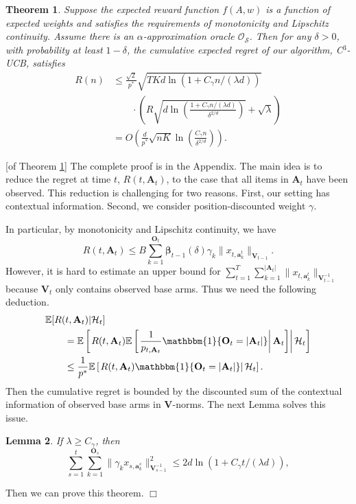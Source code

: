\documentclass{article}
\newcommand{\bbeta}{\boldsymbol{\beta}}
\newcommand{\EE}{\mathbb{E}}
\newcommand{\bOne}{\mathbbm{1}}
\newcommand{\bA}{\mathbf{A}}
\newcommand{\ba}{\mathbf{a}}
\newcommand{\bO}{\mathbf{O}}
\newcommand{\bV}{\mathbf{V}}
\newcommand{\cH}{\mathcal{H}}
\newcommand{\cO}{\mathcal{O}}
\newcommand{\cS}{\mathcal{S}}
\newcommand{\abs}[1]{\left| #1 \right|}
\newcommand{\norm}[1]{\| #1 \|}
\newtheorem{theorem}{Theorem}[section]
\newtheorem{lemma}[theorem]{Lemma}%
\newenvironment{proof}{\noindent {\textbf{Proof. }}}{$\Box$ \medskip}
\begin{document}
\begin{theorem} %
	\label{thm:main}
	Suppose the expected reward function $f(A, w)$ is a function of expected weights and satisfies the requirements of monotonicity and Lipschitz continuity. Assume there is an $\alpha$-approximation oracle $\cO_{\cS}$. Then for any $\delta > 0$, with probability at least $1 - \delta$, the cumulative expected regret of our algorithm, C$^3$-UCB, satisfies
	\begin{align}
		R(n) &\le \frac{\sqrt{2}}{p^*} \sqrt{TKd\ln(1 + C_\gamma n/(\lambda d))}  \nonumber \\
		&\qquad \cdot \left(R\sqrt{d\ln \left( \frac{1 + C_\gamma n/(\lambda d)}{\delta^{2/d}}\right) } + \sqrt{\lambda}\right) \nonumber \\
		&=O\left(\frac{d}{p^*} \sqrt{nK} \ln \left(\frac{C_\gamma n}{\delta^{2/d}}\right) \right).
	\end{align}
\end{theorem}
\begin{proof} [of Theorem \ref{thm:main}] %
	The complete proof is in the Appendix. The main idea is to reduce the regret at time $t$, $R(t, \bA_t)$, to the case that all items in $\bA_t$ have been observed. This reduction is challenging for two reasons. First, our setting has contextual information. Second, we consider position-discounted weight $\gamma$. 
	
	In particular, by monotonicity and Lipschitz continuity, we have
	$$
		R(t, \bA_t) \leq B \sum_{k=1}^{\bO_t} \bbeta_{t-1}(\delta) \gamma_k \| x_{t, \ba_k^t} \|_{\bV_{t-1}}.
	$$
	However, it is hard to estimate an upper bound for $\sum_{t=1}^T \sum_{k=1}^{\abs{\bA_t}} \norm{ x_{t, \ba_k^t} }_{ \bV_{t-1}^{-1} }$ because $\bV_t$ only contains observed base arms. Thus we need the following deduction.
	\begin{align*}
    	&\EE[R(t, \bA_t)|\cH_t] \\
    	&\qquad = \EE \left[ \left. R(t, \bA_t) \EE \left[ \left. \frac{1}{p_{t, \bA_t}} \bOne\{\bO_t = \abs{\bA_t}\} \right| \bA_t \right]  \right| \cH_t \right]\\
    	&\qquad \leq \frac{1}{p^*} \EE \left[ \left. R(t, \bA_t) \bOne\{\bO_t = \abs{\bA_t}\} \right| \cH_t \right].
    \end{align*}
    Then the cumulative regret is bounded by the discounted sum of the contextual information of observed base arms in $\bV$-norms. The next Lemma solves this issue.
    \begin{lemma}
    	\label{lem:XNormSumEst}
    	If $\lambda \geq C_{\gamma}$, then
    	$$
    	\sum_{s=1}^t \sum_{k=1}^{\bO_s} \norm{\gamma_k x_{s,\ba_{k}^s}}_{\bV_{s-1}^{-1}}^2 \leq 2d\ln \left(1 + C_{\gamma}t/(\lambda d)\right),
    	$$
    \end{lemma}
    Then we can prove this theorem.
\end{proof}
\end{document}
